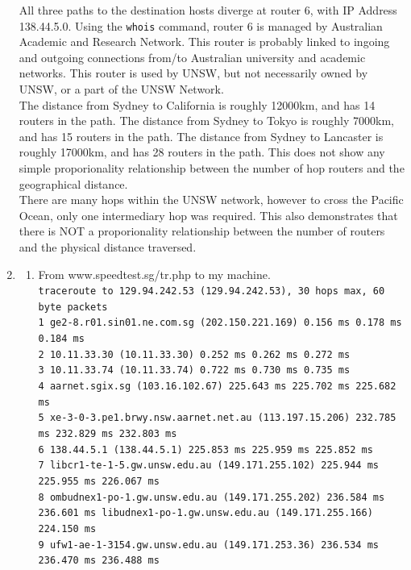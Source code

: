 \documentclass[a4paper,11pt]{article}
\newcommand{\code}{\texttt}
\begin{document}
\begin{enumerate}[leftmargin=*]
		All three paths to the destination hosts diverge at router 6, with IP Address 138.44.5.0. Using the \code{whois} command, router 6 is managed by Australian Academic and Research Network. This router is probably linked to ingoing and outgoing connections from/to Australian university and academic networks. This router is used by UNSW, but not necessarily owned by UNSW, or a part of the UNSW Network.\\
		\break
		The distance from Sydney to California is roughly 12000km, and has 14 routers in the path. The distance from Sydney to Tokyo is roughly 7000km, and has 15 routers in the path. The distance from Sydney to Lancaster is roughly 17000km, and has 28 routers in the path. This does not show any simple proporionality relationship between the number of hop routers and the geographical distance.\\
		\break
		There are many hops within the UNSW network, however to cross the Pacific Ocean, only one intermediary hop was required. This also demonstrates that there is NOT a proporionality relationship between the number of routers and the physical distance traversed.\\
	\item
		\begin{enumerate}
			\item From www.speedtest.sg/tr.php to my machine.\\
				\code{\scriptsize traceroute to 129.94.242.53 (129.94.242.53), 30 hops max, 60 byte packets\\
				 1  ge2-8.r01.sin01.ne.com.sg (202.150.221.169)  0.156 ms  0.178 ms  0.184 ms\\
				 2  10.11.33.30 (10.11.33.30)  0.252 ms  0.262 ms  0.272 ms\\
				 3  10.11.33.74 (10.11.33.74)  0.722 ms  0.730 ms  0.735 ms\\
				 4  aarnet.sgix.sg (103.16.102.67)  225.643 ms  225.702 ms  225.682 ms\\
				 5  xe-3-0-3.pe1.brwy.nsw.aarnet.net.au (113.197.15.206)  232.785 ms  232.829 ms  232.803 ms\\
				 6  138.44.5.1 (138.44.5.1)  225.853 ms  225.959 ms  225.852 ms\\
				 7  libcr1-te-1-5.gw.unsw.edu.au (149.171.255.102)  225.944 ms  225.955 ms  226.067 ms\\
				 8  ombudnex1-po-1.gw.unsw.edu.au (149.171.255.202)  236.584 ms  236.601 ms libudnex1-po-1.gw.unsw.edu.au (149.171.255.166)  224.150 ms\\
				 9  ufw1-ae-1-3154.gw.unsw.edu.au (149.171.253.36)  236.534 ms  236.470 ms  236.488 ms\\
}
\end{enumerate}
\end{enumerate}
\end{document}
